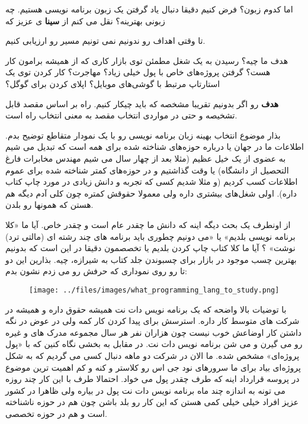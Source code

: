 اما کدوم زبون؟ فرض کنیم دقیقا دنبال یاد گرفتن یک زبون برنامه نویسی هستیم. چه زبونی بهترینه؟ نقل می کنم از
\textbf{سینا}
ی عزیز که
\begin{mdframed}
\centering
تا وقتی اهداف رو ندونیم نمی تونیم مسیر رو ارزیابی کنیم.
\end{mdframed}
هدف ما چیه؟‌ رسیدن به یک شغل مطمئن توی بازار کاری که از همیشه برامون کار هست؟ گرفتن پروژه‌های خاص با پول خیلی زیاد؟ مهاجرت؟ کار کردن توی یک استارتاپ مرتبط با گوشی‌های موبایل؟ اپلای کردن برای گوگل؟

\textbf{هدف}
رو اگر بدونیم تقریبا مشخصه که باید چیکار کنیم. راه بر اساس مقصد قابل تشخیصه و حتی در مواردی انتخاب مقصد به معنی انتخاب راه است.

بذار موضوع انتخاب بهینه زبان برنامه نویسی رو با یک نمودار متقاطع توضیح بدم. اطلاعات ما در جهان یا درباره حوزه‌های شناخته شده برای همه است که تبدیل می شیم به عضوی از یک خیل عظیم (مثلا بعد از چهار سال می شیم مهندس مخابرات فارغ التحصیل از دانشگاه) یا وقت گذاشتیم و در حوزه‌های کمتر شناخته شده برای عموم اطلاعات کسب کردیم (و مثلا شدیم کسی که تجربه و دانش زیادی در مورد چاپ کتاب داره). اولی شغل‌های بیشتری داره ولی معمولا حقوقش کمتره چون کلی آدم دیگه هم هستن که همونها رو بلدن.

 از اونطرف یک بحث دیگه اینه که دانش ما چقدر عام است و چقدر خاص. آیا ما «کلا برنامه نویسی بلدیم» یا «می دونیم چطوری باید برنامه های چند رشته ای (مالتی ترد) نوشت» ؟ آیا ما کلا کتاب چاپ کردن بلدیم یا تخصصمون دقیقا در این است که بدونیم بهترین چسب موجود در بازار برای چسبوندن جلد کتاب به شیرازه، چیه. بذارین این دو تا رو روی نموداری که حرفش رو می زدم نشون بدم:
\begin{figure}[H]
	\begin{center}
		\texttt{[image: ../files/images/what\_programming\_lang\_to\_study.png]}
	\end{center}
\end{figure}
با توضیات بالا واضحه که یک برنامه نویس دات نت همیشه حقوق داره و همیشه در شرکت های متوسط کار داره. استرسش برای پیدا کردن کار کمه ولی در عوض در نگه داشتن کار اوضاعش خوب نیست چون هزاران نفر هر سال مجموعه مدرک های
 و غیره رو می گیرن و می شن برنامه نویس دات نت. در مقابل به بخشی نگاه کنین که با «پول پروژه‌ای» مشخص شده. ما الان در شرکت دو ماهه دنبال کسی می گردیم که به شکل پروژه‌ای بیاد برای ما سرورهای نود جی اس رو کلاستر و  کنه و کم اهمیت ترین موضوع در پروسه قرارداد اینه که طرف چقدر پول می خواد. احتمالا طرف با این کار چند روزه می تونه به اندازه چند ماه برنامه نویس دات نت پول در بیاره ولی ظاهرا در کشور عزیز افراد خیلی خیلی کمی هستن که این کار رو بلد باشن چون هم در حوزه ناشناخته است و هم در حوزه تخصصی.

